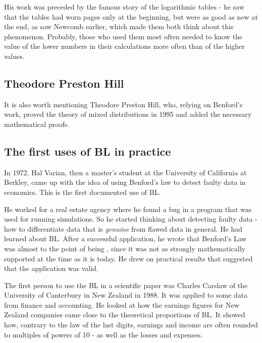 His work was preceded by the famous story of the logarithmic tables - he saw that the tables had worn pages only at the beginning, but were as good as new at the end, as saw Newcomb earlier, which made them both think about this phenomenon. Probably, those who used them most often needed to know the value of the lower numbers in their calculations more often than of the higher values.  \cite{Hronova2023}

\subsection{Theodore Preston Hill}

It is also worth mentioning Theodore Preston Hill, who, relying on Benford's work, proved the theory of mixed distributions in 1995 and added the necessary mathematical proofs. \cite{kossovsky2014benford} %

\subsection{The first uses of BL in practice}  

In 1972, Hal Varian, then a master's student at the University of California at Berkley, came up with the idea of using Benford's law to detect faulty data in economics. This is the first documented use of BL. \cite{kossovsky2014benford} %

He worked for a real estate agency where he found a bug in a program that was used for running simulations. So he started thinking about detecting faulty data - how to differentiate data that is \emph{genuine} from flawed data in general. He had learned about BL. After a successful application, he wrote that Benford's Law was almost to the point of being \emph{}, since it was not as strongly mathematically supported at the time as it is today. He drew on practical results that suggested that the application was valid. \cite{kossovsky2014benford} %

The first person to use the BL in a scientific paper was Charles Carslaw of the University of Canterbury in New Zealand in 1988. It was applied to some data from finance and accounting. He looked at how the earnings figures for New Zealand companies came close to the theoretical proportions of BL. It showed how, contrary to the law of the last digits, %
earnings and income are often rounded to multiples of powers of 10 - as well as the losses and expenses. \cite{kossovsky2014benford} %

